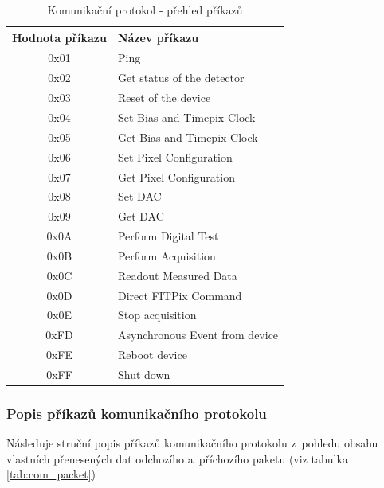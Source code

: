 \begin{table}[th]
	\begin{center}
		\begin{tabular}{|c|l|}
			\hline
			\textbf{Hodnota příkazu} & \textbf{Název příkazu} \\
			\hline
			0x01 & Ping \\
			\hline
			0x02 & Get status of the detector \\
			\hline
			0x03 & Reset of the device \\
			\hline
			0x04 & Set Bias and Timepix Clock \\
			\hline
			0x05 & Get Bias and Timepix Clock \\
			\hline
			0x06 & Set Pixel Configuration \\
			\hline
			0x07 & Get Pixel Configuration \\
			\hline
			0x08 & Set DAC \\
			\hline
			0x09 & Get DAC \\
			\hline
			0x0A & Perform Digital Test \\
			\hline
			0x0B & Perform Acquisition \\
			\hline
			0x0C & Readout Measured Data \\
			\hline
			0x0D & Direct FITPix Command \\
			\hline
			0x0E & Stop acquisition \\
			\hline
			0xFD & Asynchronous Event from device \\
			\hline
			0xFE & Reboot device \\
			\hline
			0xFF & Shut down \\
			\hline
			\end{tabular}
	\end{center}
	\caption{Komunikační protokol - přehled příkazů}
	\label{tab:commands}
\end{table}

\subsubsection{Popis příkazů komunikačního protokolu}
Následuje struční popis příkazů komunikačního protokolu z~pohledu obsahu vlastních přenesených dat odchozího a~příchozího paketu (viz tabulka \ref{tab:com_packet})

